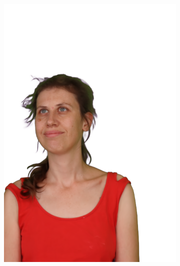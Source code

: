 \begin{figure}[!ht]
\begin{subfigure}{0.12\linewidth}
        \includegraphics[width=\textwidth]{Figures/results/initials/dora/3_render.png}

\end{subfigure}
\end{figure}
